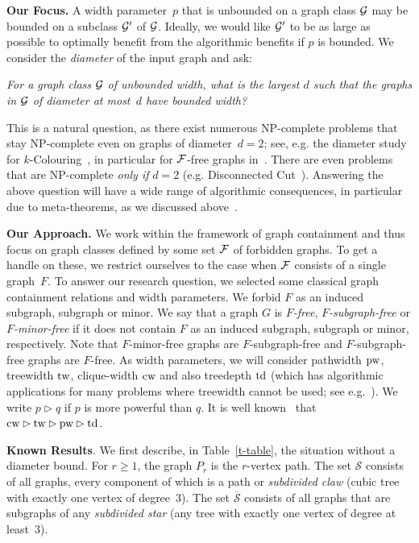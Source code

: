 \documentclass[runningheads,envcountsame]{llncs}
\newcommand{\td}{{\textup{td}}}
\newcommand{\tw}{{\textup{tw}}}
\newcommand{\cw}{{\textup{cw}}}
\newcommand{\pw}{{\textup{pw}}}
\begin{document}
\medskip
\noindent
{\bf Our Focus.} 
A width parameter~$p$ that is unbounded on a graph class ${\cal G}$ may be bounded on a subclass ${\cal G'}$ of ${\cal G}$. Ideally, we would like ${\cal G}'$ to be as large as possible to optimally benefit from the algorithmic benefits if $p$ is bounded. We consider the {\it diameter} of the input graph and ask:

\medskip
\noindent
{\it For a graph class ${\cal G}$ of unbounded width, what is the largest $d$ such that the graphs in ${\cal G}$ of diameter at most~$d$ have bounded width?}

\medskip
\noindent
This is a natural question, as there exist numerous NP-complete problems that stay NP-complete even on graphs of diameter~$d=2$; see, e.g. the diameter study for $k$-{\sc Colouring}~\cite{DPR22,MS16}, in particular for ${\cal F}$-free graphs in~\cite{DPR22,KS23,MPS22,MS16}. There are even problems that are NP-complete {\it only if} $d=2$ (e.g. {\sc Disconnected Cut}~\cite{MP15}). Answering the above question will have a wide range of algorithmic consequences, in particular due to meta-theorems, as we discussed 
above~\cite{CMR00,CO00}.

\medskip
\noindent
{\bf Our Approach.} We work within the framework of graph containment and thus focus on graph classes defined by some set ${\cal F}$ of forbidden graphs. To get a handle on these, we restrict ourselves to the case when ${\cal F}$ consists of a single graph~$F$.  
To answer our research question, we selected some classical graph containment relations and width parameters. We forbid $F$ as an induced subgraph, subgraph or minor. We say that a graph $G$ is {\it $F$-free}, {\it $F$-subgraph-free} or {\it $F$-minor-free} if it does not contain $F$ as an induced subgraph, subgraph or minor, respectively. Note that $F$-minor-free graphs are $F$-subgraph-free and $F$-subgraph-free graphs are $F$-free. As width parameters, we will consider pathwidth $\pw$, treewidth $\tw$, clique-width $\cw$ and also treedepth $\td$
(which has algorithmic applications for many problems where treewidth cannot be used; see 
e.g.~\cite{GajarskyHlineny12,GanianOrdyniak18,GJW16,IwataOgasawaraOhsaka18,KLO18}). 
We write $p \rhd q$ if $p$ is more powerful than $q$. It is well known~\cite{BGHK95,CO00} that $\cw \rhd \tw \rhd \pw \rhd \td$. 
 
\medskip
\noindent
{\bf Known Results}.
 We first describe, in Table~\ref{t-table},
 the situation without a diameter bound. For $r\geq 1$, the
 graph $P_r$ is the $r$-vertex path. The set ${\mathcal S}$ consists
 of all graphs, every component of which is a path or 
 {\it subdivided claw} (cubic tree with exactly one vertex of
 degree~$3$). The set $\overline{{\mathcal S}}$ consists of all graphs that are  subgraphs of any {\it subdivided star}  (any tree with exactly one vertex of degree at least~$3$).
 
\end{document}

